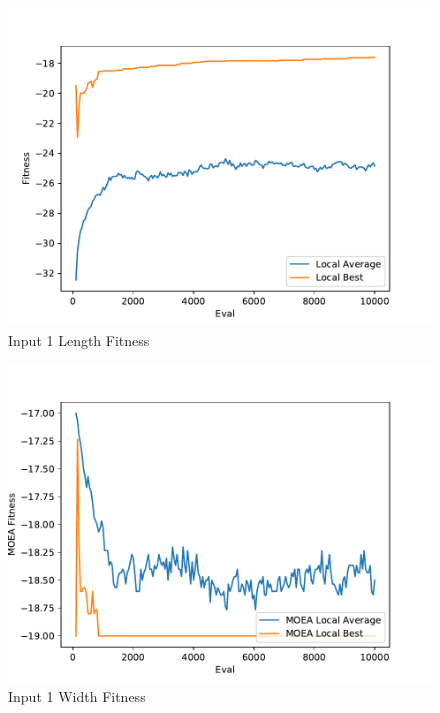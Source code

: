 \documentclass{standalone}
\begin{document}
\begin{figure}[!htb]
	\caption{Input 1 Length Fitness}
	\label{fig:graph_1003}
	\includegraphics[width=\textwidth]{../graphs/graphs/1003.pdf}
\end{figure}


\begin{figure}[!htb]
	\caption{Input 1 Width Fitness}
	\label{fig:graph_1003_moea}
	\includegraphics[width=\textwidth]{../graphs/graphs/1003_moea.pdf}
\end{figure}
\end{document}
